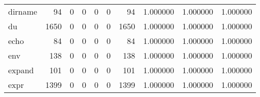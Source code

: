 \begin{tabular}{lrrrrrrrrr}
dirname   &                                                 94 &                                                  0 &                                                  0 &                                                  0 &                                                  0 &                                                 94 &                                           1.000000 &                               1.000000 &                             1.000000 \\
du        &                                               1650 &                                                  0 &                                                  0 &                                                  0 &                                                  0 &                                               1650 &                                           1.000000 &                               1.000000 &                             1.000000 \\
echo      &                                                 84 &                                                  0 &                                                  0 &                                                  0 &                                                  0 &                                                 84 &                                           1.000000 &                               1.000000 &                             1.000000 \\
env       &                                                138 &                                                  0 &                                                  0 &                                                  0 &                                                  0 &                                                138 &                                           1.000000 &                               1.000000 &                             1.000000 \\
expand    &                                                101 &                                                  0 &                                                  0 &                                                  0 &                                                  0 &                                                101 &                                           1.000000 &                               1.000000 &                             1.000000 \\
expr      &                                               1399 &                                                  0 &                                                  0 &                                                  0 &                                                  0 &                                               1399 &                                           1.000000 &                               1.000000 &                             1.000000 \\

\end{tabular}
